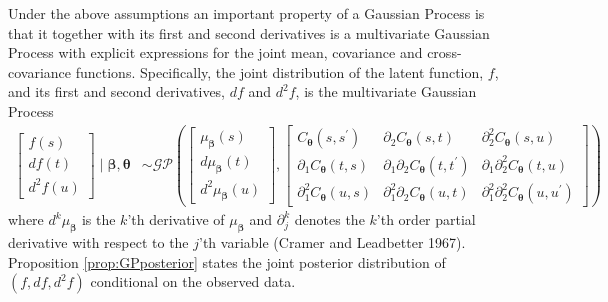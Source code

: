 \documentclass[
  11pt,
]{article}
\theoremstyle{nonumberplain}
\begin{document}
Under the above assumptions an important property of a Gaussian Process
is that it together with its first and second derivatives is a
multivariate Gaussian Process with explicit expressions for the joint
mean, covariance and cross-covariance functions. Specifically, the joint
distribution of the latent function, \(f\), and its first and second
derivatives, \(df\) and \(d^2\!f\), is the multivariate Gaussian Process
\begin{align}
  \begin{bmatrix}f(s)\\ df(t)\\ d^2\!f(u)\end{bmatrix} \mid \bm{\beta}, \bm{\theta} &\sim \mathcal{GP}\left(\begin{bmatrix}\mu_{\bm{\beta}}(s)\\ d\mu_{\bm{\beta}}(t)\\ d^2\!\mu_{\bm{\beta}}(u)\end{bmatrix}, \begin{bmatrix}C_{\bm{\theta}}(s, s^\prime) & \partial_2 C_{\bm{\theta}}(s, t) & \partial_2^2 C_{\bm{\theta}}(s, u)\\ \partial_1 C_{\bm{\theta}}(t, s) & \partial_1 \partial_2 C_{\bm{\theta}}(t, t^\prime) & \partial_1 \partial_2^2 C_{\bm{\theta}}(t, u)\\ \partial_1^2 C_{\bm{\theta}}(u, s) & \partial_1^2\partial_2 C_{\bm{\theta}}(u, t) & \partial_1^2 \partial_2^2 C_{\bm{\theta}}(u, u^\prime)\end{bmatrix}\right)\label{eq:latentJoint}
\end{align} where \(d^k\!\mu_{\bm{\beta}}\) is the \(k\)'th derivative
of \(\mu_{\bm{\beta}}\) and \(\partial_j^k\) denotes the \(k\)'th order
partial derivative with respect to the \(j\)'th variable (Cramer and
Leadbetter 1967). Proposition \ref{prop:GPposterior} states the joint
posterior distribution of \((f, df, d^2\!f)\) conditional on the
observed data.

\vspace{0.2cm}
\end{document}
